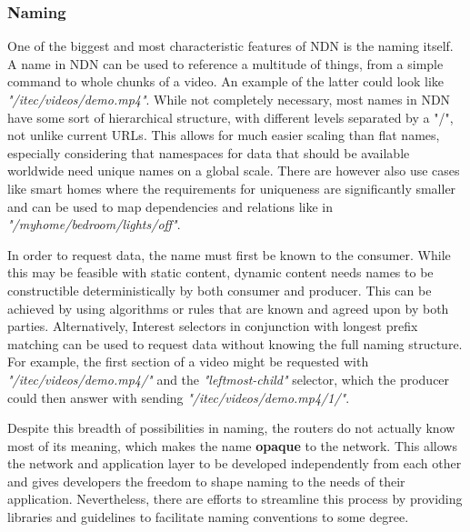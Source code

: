 \subsubsection{Naming}



One of the biggest and most characteristic features of NDN is the naming itself. A name in NDN can be used to reference a multitude of things, from a simple command to whole chunks of a video. An example of the latter could look like \textit{"/itec/videos/demo.mp4"}. While not completely necessary, most names in NDN have some sort of hierarchical structure, with different levels separated by a "/", not unlike current URLs. This allows for much easier scaling than flat names, especially considering that namespaces for data that should be available worldwide need unique names on a global scale. There are however also use cases like smart homes where the requirements for uniqueness are significantly smaller and can be used to map dependencies and relations like in \textit{"/myhome/bedroom/lights/off"}.

In order to request data, the name must first be known to the consumer. While this may be feasible with static content, dynamic content needs names to be constructible deterministically by both consumer and producer. This can be achieved by using algorithms or rules that are known and agreed upon by both parties. Alternatively, Interest selectors in conjunction with longest prefix matching can be used to request data without knowing the full naming structure. For example, the first section of a video might be requested with \textit{"/itec/videos/demo.mp4/"} and the \textit{"leftmost-child"} selector, which the producer could then answer with sending \textit{"/itec/videos/demo.mp4/1/"}.

Despite this breadth of possibilities in naming, the routers do not actually know most of its meaning, which makes the name \textbf{opaque} to the network. This allows the network and application layer to be developed independently from each other and gives developers the freedom to shape naming to the needs of their application. Nevertheless, there are efforts to streamline this process by providing libraries and guidelines to facilitate naming conventions to some degree. \cite{ZABJ14,ZEBJ10}
